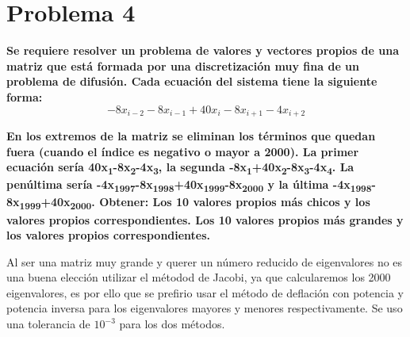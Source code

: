 \section*{Problema 4}

\textbf{
    Se requiere resolver un problema de valores y vectores propios de una matriz que está formada por una discretización muy fina de un problema de difusión. Cada ecuación del sistema tiene la siguiente forma:
}
\begin{equation*}
    -8x_{i-2} -8x_{i-1}+40x_{i}-8x_{i+1}-4x_{i+2}
\end{equation*}

\textbf{En los extremos de la matriz se eliminan los términos que quedan fuera (cuando el índice es negativo o mayor a 2000). La primer ecuación sería 40x\textsubscript{1}-8x\textsubscript{2}-4x\textsubscript{3}, la segunda -8x\textsubscript{1}+40x\textsubscript{2}-8x\textsubscript{3}-4x\textsubscript{4}. La penúltima sería -4x\textsubscript{1997}-8x\textsubscript{1998}+40x\textsubscript{1999}-8x\textsubscript{2000} y la última -4x\textsubscript{1998}-8x\textsubscript{1999}+40x\textsubscript{2000}.
    Obtener: Los 10 valores propios más chicos y los valores propios correspondientes. Los 10 valores propios más grandes y los valores propios correspondientes.}


Al ser una matriz muy grande y querer un número reducido de eigenvalores no es una buena elección utilizar el métodod de Jacobi, ya que calcularemos los 2000 eigenvalores, es por ello que se prefirio usar el método de deflación con potencia y potencia inversa para los eigenvalores mayores y menores respectivamente. Se uso una tolerancia de  $10^{-3}$ para los dos métodos.